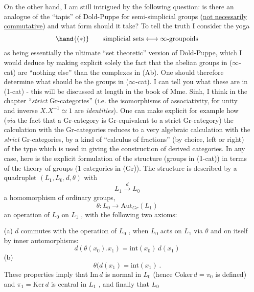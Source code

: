 On the other hand, I am still intrigued by the following question: is
there an analogue of the ``tapis'' of Dold-Puppe for semi-simplicial groups (\uline{not
necessarily commutative}) and what form should it take? To tell the truth I
consider the yoga
\[ \hand{(*)} \qquad \text{simplicial sets} \longleftrightarrow \infty\text{-groupoids} \]
as being essentially the ultimate ``set theoretic'' version of Dold-Puppe, which
I would deduce  by making explicit solely the fact that the abelian groups in
($\infty$-cat) are ``nothing else'' than the  complexes  in (Ab). One should
therefore  determine what should be the groups in ($\infty$-cat). I can tell you
what these are in (1-cat) - this will be discussed at length in the book of
Mme. Sinh, I think in the chapter ``\emph{strict} Gr-categories'' (i.e. the isomorphisms
of associativity, for unity and inverse $X.X^{-1} \simeq 1$ are \emph{identities}). One can
make explicit for example how (\emph{via} the fact that a Gr-category is Gr-equivalent
to a strict Gr-category) the calculation with the Gr-categories reduces to a
very algebraic calculation with the \emph{strict} Gr-categories, by a kind of
``calculus of fractions'' (by choice, left or right) of the type which is used
in giving the construction of derived categories. In any case, here is the
explicit formulation of the structure (groups in (1-cat)) in terms of the
theory of groups (1-categories in (Gr)). The structure is described by a
quadruplet $(L_1, L_0, d, \theta)$ with
\[ L_1 \xrightarrow{d} L_0 \]
a homomorphism of ordinary groups,
\[ \theta : L_0 \longrightarrow \mathrm{Aut}_{Gr}(L_1) \]
an operation of $L_0$ on $L_1$ , with the following two axioms:

(a) $d$ commutes with the operation of $L_0$ , when $L_0$ acts on $L_1$
via $\theta$ and on itself by inner automorphisms:
\[ d(\theta(x_0).x_1) = \mathrm{int}(x_0)\, d(x_1) \]
(b) \[ \theta(d(x_1) = \mathrm{int}(x_1) \ . \]
These properties imply that $\mathrm{Im}\, d$ is normal in $L_0$\over{,}{\unsure{;}} (hence $\mathrm{Coker}\, d = \pi_0$
is defined) and $\pi_1 = \mathrm{Ker}\, d$ is central in $L_1$ , and finally that $L_0$

